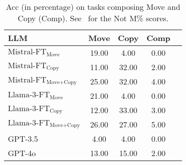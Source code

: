 \begin{table}[tb]
\small
\centering
\setlength{\tabcolsep}{2mm}
\begin{tabular}{lcc|cc}
\toprule
\textbf{LLM} &\textbf{Move} & \textbf{Copy} & \textbf{Comp} %
\\
\midrule
$\text{Mistral-FT}_{\text{Move}}$ & 19.00 & 4.00& 0.00  \\
$\text{Mistral-FT}_{\text{Copy}}$ &11.00 &32.00 & 2.00\\
$\text{Mistral-FT}_{\text{Move+Copy}}$ & 25.00& 32.00&4.00\\
\midrule
$\text{Llama-3-FT}_{\text{Move}}$ &21.00 &4.00 &0.00\\
$\text{Llama-3-FT}_{\text{Copy}}$ &12.00 &33.00 & 3.00\\
$\text{Llama-3-FT}_{\text{Move+Copy}}$ &26.00 & 27.00&5.00\\
\midrule
GPT-3.5 &4.00 &4.00 & 0.00\\
GPT-4o &13.00 &15.00 & 2.00\\
\bottomrule
\end{tabular}
\caption{Acc (in percentage) on tasks composing Move and Copy (Comp).
See~ for the Not M\% scores.}
\vspace{-0.2in}
\label{tab:composition}
\end{table}


